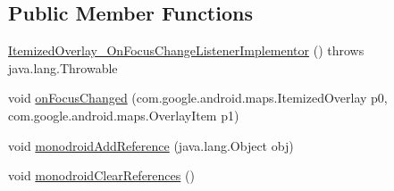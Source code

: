 \subsection*{Public Member Functions}
\begin{DoxyCompactItemize}
\item 
\hyperlink{classmono_1_1com_1_1google_1_1android_1_1maps_1_1_itemized_overlay___on_focus_change_listener_implementor_aea24063fe40f3a56b2c232343ee64abd}{Itemized\+Overlay\+\_\+\+On\+Focus\+Change\+Listener\+Implementor} ()  throws java.\+lang.\+Throwable 	
\item 
void \hyperlink{classmono_1_1com_1_1google_1_1android_1_1maps_1_1_itemized_overlay___on_focus_change_listener_implementor_adb85886f79f0ebb86e6f74d6b01ca451}{on\+Focus\+Changed} (com.\+google.\+android.\+maps.\+Itemized\+Overlay p0, com.\+google.\+android.\+maps.\+Overlay\+Item p1)
\item 
void \hyperlink{classmono_1_1com_1_1google_1_1android_1_1maps_1_1_itemized_overlay___on_focus_change_listener_implementor_ab60596c4c8ac9b6598e492bd29dbf0bc}{monodroid\+Add\+Reference} (java.\+lang.\+Object obj)
\item 
void \hyperlink{classmono_1_1com_1_1google_1_1android_1_1maps_1_1_itemized_overlay___on_focus_change_listener_implementor_a0c76975a58546effab469e197c8f9aa9}{monodroid\+Clear\+References} ()
\end{DoxyCompactItemize}


